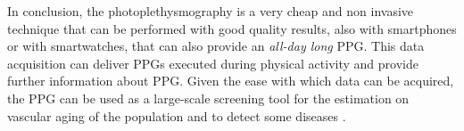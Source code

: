 \documentclass[12pt,a4paper,twocolumn]{article}
\begin{document}
		In conclusion, the photoplethysmography is a very cheap and non invasive technique that can be performed with good quality results, also with smartphones or with smartwatches, that can also provide an \emph{all-day long} PPG. This data acquisition can deliver PPGs executed during physical activity and provide further information about PPG. Given the ease with which data can be acquired, the PPG can be used as a large-scale screening tool for the estimation on vascular aging of the population and to detect some diseases \cite{review}.
			
		\newpage
		\printbibliography
\end{document}
